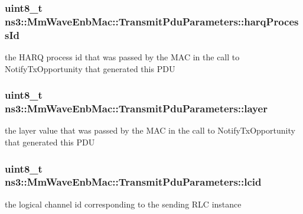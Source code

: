 \subsubsection[{\texorpdfstring{harq\+Process\+Id}{harqProcessId}}]{\setlength{\rightskip}{0pt plus 5cm}uint8\+\_\+t ns3\+::\+Mm\+Wave\+Enb\+Mac\+::\+Transmit\+Pdu\+Parameters\+::harq\+Process\+Id}\hypertarget{structns3_1_1MmWaveEnbMac_1_1TransmitPduParameters_a0a8a70f44ff6e9a17c5fa452e67ce590}{}\label{structns3_1_1MmWaveEnbMac_1_1TransmitPduParameters_a0a8a70f44ff6e9a17c5fa452e67ce590}
the H\+A\+RQ process id that was passed by the M\+AC in the call to Notify\+Tx\+Opportunity that generated this P\+DU 
\subsubsection[{\texorpdfstring{layer}{layer}}]{\setlength{\rightskip}{0pt plus 5cm}uint8\+\_\+t ns3\+::\+Mm\+Wave\+Enb\+Mac\+::\+Transmit\+Pdu\+Parameters\+::layer}\hypertarget{structns3_1_1MmWaveEnbMac_1_1TransmitPduParameters_aca6a6931f952e41a376b038c3dde98aa}{}\label{structns3_1_1MmWaveEnbMac_1_1TransmitPduParameters_aca6a6931f952e41a376b038c3dde98aa}
the layer value that was passed by the M\+AC in the call to Notify\+Tx\+Opportunity that generated this P\+DU 
\subsubsection[{\texorpdfstring{lcid}{lcid}}]{\setlength{\rightskip}{0pt plus 5cm}uint8\+\_\+t ns3\+::\+Mm\+Wave\+Enb\+Mac\+::\+Transmit\+Pdu\+Parameters\+::lcid}\hypertarget{structns3_1_1MmWaveEnbMac_1_1TransmitPduParameters_a7c77c0d48096557647af35db42fe1e87}{}\label{structns3_1_1MmWaveEnbMac_1_1TransmitPduParameters_a7c77c0d48096557647af35db42fe1e87}
the logical channel id corresponding to the sending R\+LC instance 

